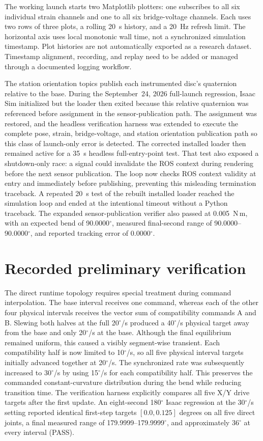 \documentclass[11pt,letterpaper]{article}
\newcommand{\degrees}{\ensuremath{^{\circ}}}
\begin{document}
The working launch starts two Matplotlib plotters: one subscribes to all six
individual strain channels and one to all six bridge-voltage channels. Each
uses two rows of three plots, a rolling 20~s history, and a 20~Hz refresh limit.
The horizontal axis uses local monotonic wall time, not a synchronized
simulation timestamp. Plot histories are not automatically exported as a
research dataset. Timestamp alignment, recording, and replay need to be added
or managed through a documented logging workflow.

The station orientation topics publish each instrumented disc's quaternion
relative to the base. During the September~24, 2026 full-launch regression,
Isaac Sim initialized but the loader then exited because this relative
quaternion was referenced before assignment in the sensor-publication path.
The assignment was restored, and the headless verification harness was
extended to execute the complete pose, strain, bridge-voltage, and station
orientation publication path so this class of launch-only error is detected.
The corrected installed loader then remained active for a 35~s headless
full-entry-point test. That test also exposed a shutdown-only race: a signal
could invalidate the ROS context during rendering before the next sensor
publication. The loop now checks ROS context validity at entry and immediately
before publishing, preventing this misleading termination traceback.
A repeated 20~s test of the rebuilt installed loader reached the simulation
loop and ended at the intentional timeout without a Python traceback. The
expanded sensor-publication verifier also passed at 0.005~N\,m, with an
expected bend of 90.0000\degrees{}, measured final-second range of
90.0000--90.0000\degrees{}, and reported tracking error of 0.0000\degrees{}.

\section{Recorded preliminary verification}\label{sec:validation}
The direct runtime topology requires special treatment during command
interpolation. The base interval receives one command, whereas each of the
other four physical intervals receives the vector sum of compatibility
commands A and B. Slewing both halves at the full 20\degrees{}/s produced a
40\degrees{}/s physical target away from the base and only 20\degrees{}/s at
the base. Although the final equilibrium remained uniform, this caused a
visibly segment-wise transient. Each compatibility half is now limited to
10\degrees{}/s, so all five physical interval targets initially advanced
together at 20\degrees{}/s. The synchronized rate was subsequently increased
to 30\degrees{}/s by using 15\degrees{}/s for each compatibility half. This
preserves the commanded constant-curvature distribution during the bend while
reducing transition time. The verification harness explicitly compares all
five X/Y drive targets after the first update.
An eight-second 180\degrees{} Isaac regression at the 30\degrees{}/s setting
reported identical first-step targets $[0.0,0.125]$ degrees on all five direct
joints, a final measured range of 179.9999--179.9999\degrees{}, and
approximately 36\degrees{} at every interval (PASS).
\end{document}
